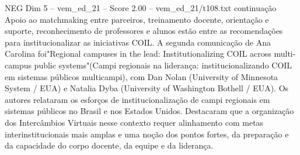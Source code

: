 \begin{textsample}{NEG Dim 5 – vem\_ed\_21 – Score 2.00 – vem\_ed\_21/t108.txt}  \label{ex:f5_neg_077}
continuação Apoio ao matchmaking entre parceiros, treinamento docente, orientação e suporte, reconhecimento de professores e alunos estão entre as recomendações para institucionalizar as iniciativas COIL.
A segunda comunicação de Ana Carolina foi"Regional campuses in the lead: Institutionalizing COIL across multi-campus public systems"(Campi regionais na liderança: institucionalizando COIL em sistemas públicos multicampi), com Dan Nolan (University of Minnesota System / EUA) e Natalia Dyba (University of Washington Bothell / EUA).
Os autores relataram os esforços de institucionalização de campi regionais em sistemas públicos no Brasil e nos Estados Unidos.
Destacaram que a organização dos Intercâmbios Virtuais nesse contexto requer alinhamento com metas interinstitucionais mais amplas e uma noção dos pontos fortes, da preparação e da capacidade do corpo docente, da equipe e da liderança.

\end{textsample}
